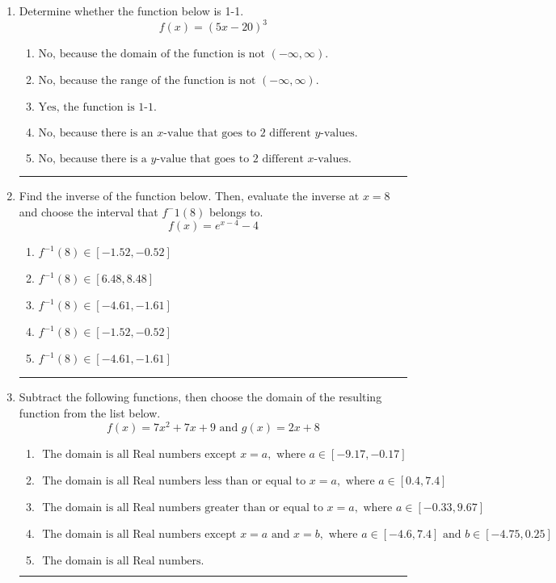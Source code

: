 \documentclass[14pt]{extbook}
\newcommand{\litem}[1]{\item#1\hspace*{-1cm}\rule{\textwidth}{0.4pt}}
\begin{document}
\begin{enumerate}
{\begin{enumerate}[label=\Alph*.]
\end{enumerate} }
\litem{
Determine whether the function below is 1-1.\[ f(x) = (5 x - 20)^3 \]\begin{enumerate}[label=\Alph*.]
\item \( \text{No, because the domain of the function is not $(-\infty, \infty)$.} \)
\item \( \text{No, because the range of the function is not $(-\infty, \infty)$.} \)
\item \( \text{Yes, the function is 1-1.} \)
\item \( \text{No, because there is an $x$-value that goes to 2 different $y$-values.} \)
\item \( \text{No, because there is a $y$-value that goes to 2 different $x$-values.} \)

\end{enumerate} }
\litem{
Find the inverse of the function below. Then, evaluate the inverse at $x = 8$ and choose the interval that $f^-1(8)$ belongs to.\[ f(x) = e^{x-4}-4 \]\begin{enumerate}[label=\Alph*.]
\item \( f^{-1}(8) \in [-1.52, -0.52] \)
\item \( f^{-1}(8) \in [6.48, 8.48] \)
\item \( f^{-1}(8) \in [-4.61, -1.61] \)
\item \( f^{-1}(8) \in [-1.52, -0.52] \)
\item \( f^{-1}(8) \in [-4.61, -1.61] \)

\end{enumerate} }
\litem{
Subtract the following functions, then choose the domain of the resulting function from the list below.\[ f(x) = 7x^{2} +7 x + 9 \text{ and } g(x) = 2x + 8 \]\begin{enumerate}[label=\Alph*.]
\item \( \text{ The domain is all Real numbers except } x = a, \text{ where } a \in [-9.17, -0.17] \)
\item \( \text{ The domain is all Real numbers less than or equal to } x = a, \text{ where } a \in [0.4, 7.4] \)
\item \( \text{ The domain is all Real numbers greater than or equal to } x = a, \text{ where } a \in [-0.33, 9.67] \)
\item \( \text{ The domain is all Real numbers except } x = a \text{ and } x = b, \text{ where } a \in [-4.6, 7.4] \text{ and } b \in [-4.75, 0.25] \)
\item \( \text{ The domain is all Real numbers. } \)


\end{enumerate}}
\end{enumerate}
\end{document}
